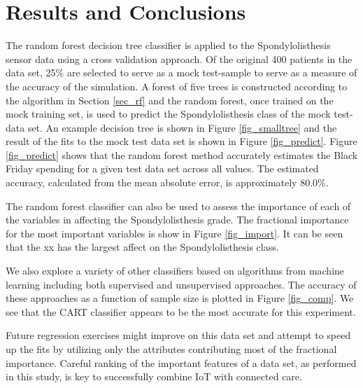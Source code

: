 \documentclass[10pt]{article}
\begin{document}
\section{Results and Conclusions}
\label{sec_res}
The random forest decision tree classifier is applied to the Spondylolisthesis sensor data using a cross validation approach. Of the original 400 patients in the data set, 25\% are selected to serve as a mock test-sample to serve as a measure of the accuracy of the simulation. A forest of five trees is constructed according to the algorithm in Section \ref{sec_rf} and the random forest, once trained on the mock training set, is used to predict the Spondylolisthesis class of the mock test-data set. An example decision tree is shown in Figure \ref{fig_smalltree} and the result of the fits to the mock test data set is shown in Figure \ref{fig_predict}. Figure \ref{fig_predict} shows that the random forest method accurately estimates the Black Friday spending for a given test data set across all values. The estimated accuracy, calculated from the mean absolute error, is approximately 80.0\%. 

The random forest classifier can also be used to assess the importance of each of the variables in affecting the Spondylolisthesis grade. The fractional importance for the most important variables is show in Figure \ref{fig_import}. It can be seen that the xx has the largest affect on the Spondylolisthesis class. 

We also explore a variety of other classifiers based on algorithms from machine learning including both supervised and unsupervised approaches. The accuracy of these approaches as a function of sample size is plotted in Figure \ref{fig_comp}. We see that the CART classifier appears to be the most accurate for this experiment.



Future regression exercises might improve on this data set and attempt to speed up the fits by utilizing only the attributes contributing most of the fractional importance. Careful ranking of the important features of a data set, as performed in this study, is key to successfully combine IoT with connected care.
\end{document}
